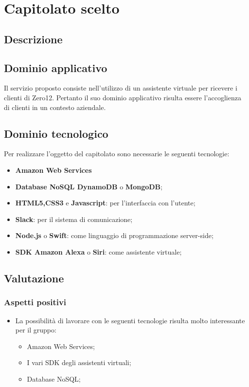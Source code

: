 \section {Capitolato scelto}
	\subsection {Descrizione}
		\SCOPO
	\subsection {Dominio applicativo}
Il servizio proposto consiste nell'utilizzo di un assistente virtuale per ricevere i clienti di Zero12. Pertanto il suo dominio applicativo risulta essere l'accoglienza di clienti in un contesto aziendale.
	\subsection {Dominio tecnologico}
		Per realizzare l'oggetto del capitolato sono necessarie le seguenti tecnologie:
		\begin {itemize}
			\item \textbf{Amazon Web Services}
			\item \textbf{Database NoSQL DynamoDB} o \textbf{MongoDB};
			\item \textbf{HTML5,CSS3} e \textbf{Javascript}: per l'interfaccia con l'utente;
			\item \textbf{Slack}: per il sistema di comunicazione;
			\item \textbf{Node.js} o \textbf{Swift}: come linguaggio di programmazione
 server-side;
 			\item \textbf{SDK Amazon Alexa} o \textbf{Siri}: come assistente virtuale;

		\end {itemize}
	\subsection {Valutazione}
		\subsubsection {Aspetti positivi}
			\begin {itemize}
				\item La possibilità di lavorare con le seguenti tecnologie risulta molto interessante per il gruppo:
				 \begin {itemize}
				 	\item Amazon Web Services;
				 	\item I vari SDK degli assistenti virtuali;
				 	\item Database NoSQL;
				 \end {itemize}
			\end {itemize}
